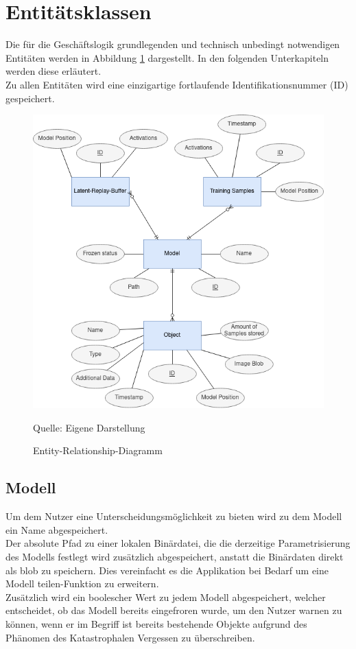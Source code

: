 \documentclass[oneside]{ausarbeitung}
\begin{document}
\section{Entitätsklassen}
\label{cha:design:entities}
Die für die Geschäftslogik grundlegenden und technisch unbedingt notwendigen Entitäten werden in Abbildung \ref{fig:er-diagram} dargestellt. In den folgenden Unterkapiteln werden diese erläutert.\\
Zu allen Entitäten wird eine einzigartige fortlaufende Identifikationsnummer (ID) gespeichert.
\begin{figure}[hptb]
	\centering
	\includegraphics[height=0.6\textheight]{images/er-diagram.png}
	\caption{Entity-Relationship-Diagramm} Quelle: Eigene Darstellung
	\label{fig:er-diagram}
\end{figure}

\subsection{Modell}
Um dem Nutzer eine Unterscheidungsmöglichkeit zu bieten wird zu dem Modell ein Name abgespeichert.\\
Der absolute Pfad zu einer lokalen Binärdatei, die die derzeitige Parametrisierung des Modells festlegt wird zusätzlich abgespeichert, anstatt die Binärdaten direkt als \ac{blob} zu speichern. Dies vereinfacht es die Applikation bei Bedarf um eine \glqq Modell teilen\grqq-Funktion zu erweitern. \\
Zusätzlich wird ein boolescher Wert zu jedem Modell abgespeichert, welcher entscheidet, ob das Modell bereits eingefroren wurde, um den Nutzer warnen zu können, wenn er im Begriff ist bereits bestehende Objekte aufgrund des Phänomen des Katastrophalen Vergessen zu überschreiben.
\end{document}
